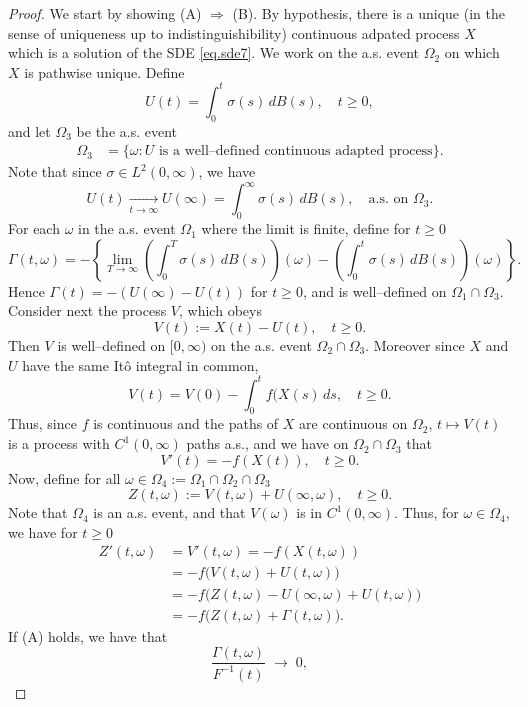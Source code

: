 \documentclass[a4paper,10pt,reqno]{amsart}
\numberwithin{equation}{section}
\theoremstyle{definition}
\theoremstyle{remark}
\DeclareMathOperator{\1}{\mathbbm 1}
\begin{document}
	\begin{proof} We start by showing (A) $\Rightarrow$ (B). By hypothesis, there is a unique (in the sense of uniqueness up to indistinguishibility) continuous adpated process $X$ which is a solution of the SDE \eqref{eq.sde7}. We work on the a.s. event $\Omega_2$ on which $X$ is pathwise unique. Define 
		\[
		U(t) = \int_{0}^{t} \sigma(s)\, dB(s), \quad t\geq0,
		\]
		and let  $\Omega_3$ be the a.s. event
		\begin{align*}
			\Omega_3 &= \{\omega : U \text{ is a well--defined continuous adapted process}\}. 
		\end{align*}
		Note that since $\sigma \in L^2(0,\infty)$, we have 
		\[
		U(t) \xrightarrow[t \to \infty]{} U(\infty) = \int_{0}^{\infty} \sigma(s)\, dB(s), \quad \text{a.s. on $\Omega_3$}.
		\]
		For each $\omega$ in the a.s. event $\Omega_{1}$ where the limit is finite, define for $t \geq 0$ 
		\[
		\Gamma(t,\omega) = -\left\{ \lim_{T \to \infty}\left( \int_{0}^{T} \sigma(s)\, dB(s)\right)(\omega) 
		- \left(\int_{0}^{t} \sigma(s)\, dB(s)\right)(\omega) \right\}.
		\]
		Hence $\Gamma(t) = -(U(\infty) - U(t))$ for $t \geq 0$, and is well--defined on $\Omega_1\cap \Omega_3$.	Consider next
		the process $V$, which obeys  	
		\[
		V(t) := X(t) - U(t), \quad t \geq 0.
		\]
		Then $V$ is well--defined on $[0,\infty)$ on the a.s. event $\Omega_2\cap \Omega_3$. Moreover since $X$ and $U$ have the same It\^o integral in common,
		\[
		V(t) = V(0)-\int_0^t f(X(s)\,ds, \quad t\geq 0.
		\]
		Thus, since $f$ is continuous and the paths of $X$ are continuous on $\Omega_2$, $t \mapsto V(t)$ is a process with $C^1(0,\infty)$ paths a.s., and we have on $\Omega_2\cap \Omega_3$ that
		\[
		V'(t) = -f(X(t)), \quad t \geq 0.
		\]
		Now, define for all $\omega \in \Omega_4 := \Omega_1 \cap \Omega_2\cap \Omega_3$
		\[
		Z(t,\omega) := V(t,\omega) + U(\infty,\omega), \quad t \geq 0.
		\]
		Note that $\Omega_4$ is an a.s. event, and that $V(\omega)$ is in $C^1(0,\infty)$. Thus, for $\omega \in \Omega_4$, we have for $t\geq 0$
		\begin{align*}
			Z'(t,\omega) &= V'(t,\omega) = -f(X(t,\omega)) \\
			&= -f\big(V(t,\omega) + U(t,\omega)\big)\\
			&= - f\big( Z(t,\omega) - U(\infty,\omega) + U(t,\omega) \big)\\
			&=- f\big( Z(t,\omega) + \Gamma(t,\omega) \big).
		\end{align*}
		If (A) holds, we have that
		\[
		\frac{\Gamma(t,\omega)}{F^{-1}(t)} \;\longrightarrow\; 0, 
\]
\end{proof}
\end{document}
